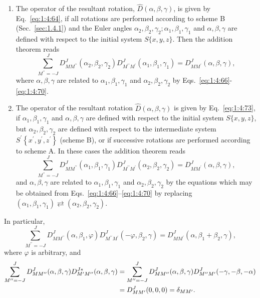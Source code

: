 \begin{enumerate}[label=(\alph*)]
\item The operator of the resultant rotation, $\widehat{D}(\alpha, \beta, \gamma)$, is given by Eq.~\eqref{eq:1:4:64}, if all rotations are performed according to scheme B (Sec.~\ref{sec:1.4.1}) and the Euler angles $\alpha_{2}, \beta_{2}, \gamma_{2} ; \alpha_{1}, \beta_{1}, \gamma_{1}$ and $\alpha, \beta, \gamma$ are defined with respect to the initial system $S\{x, y, z\}$. Then the addition theorem reads
\begin{equation}
\sum_{M^{\prime \prime}=-J}^{J} D_{M M^{\prime \prime}}^{J}\left(\alpha_{2}, \beta_{2}, \gamma_{2}\right) D_{M^{\prime \prime} M^{\prime}}^{J}\left(\alpha_{1}, \beta_{1}, \gamma_{1}\right)=D_{M M^{\prime}}^{J}(\alpha, \beta, \gamma) ,\label{eq:4:7:1}
\end{equation}
where $\alpha, \beta, \gamma$ are related to $\alpha_{1}, \beta_{1}, \gamma_{1}$ and $\alpha_{2}, \beta_{2}, \gamma_{2}$ by Eqs.~\eqref{eq:1:4:66}-\eqref{eq:1:4:70}.\\
\item The operator of the resultant rotation $\hat{D}(\alpha, \beta, \gamma)$ is given by Eq.~\eqref{eq:1:4:73}, if $\alpha_{1}, \beta_{1}, \gamma_{1}$ and $\alpha, \beta, \gamma$ are defined with respect to the initial system $S\{x, y, z\}$, but $\alpha_{2}, \beta_{2}, \gamma_{2}$ are defined with respect to the intermediate system $S^{\prime}\left\{x^{\prime}, y^{\prime}, z^{\prime}\right\}$ (scheme B), or if successive rotations are performed according to scheme A. In these cases the addition theorem reads
\begin{equation}
\sum_{M^{\prime \prime}=-J}^{J} D_{M M^{\prime \prime}}^{J}\left(\alpha_{1}, \beta_{1}, \gamma_{1}\right) D_{M^{\prime \prime} M^{\prime}}^{J}\left(\alpha_{2}, \beta_{2}, \gamma_{2}\right)=D_{M M^{\prime}}^{J}(\alpha, \beta, \gamma) ,\label{eq:4:7:2}
\end{equation}
and $\alpha, \beta, \gamma$ are related to $\alpha_{1}, \beta_{1}, \gamma_{1}$ and $\alpha_{2}, \beta_{2}, \gamma_{2}$ by the equations which may be obtained from Eqs.~\eqref{eq:1:4:66}--\eqref{eq:1:4:70} by replacing $\left(\alpha_{1}, \beta_{1}, \gamma_{1}\right) \rightleftarrows\left(\alpha_{2}, \beta_{2}, \gamma_{2}\right)$.
\end{enumerate}
In particular,
\begin{equation}
\sum_{M^{\prime \prime}=-J}^{J} D_{M M^{\prime \prime}}^{J}\left(\alpha, \beta_{1}, \varphi\right) D_{M^{\prime \prime} M^{\prime}}^{J}\left(-\varphi, \beta_{2}, \gamma\right)=D_{M M^{\prime}}^{J}\left(\alpha, \beta_{1}+\beta_{2}, \gamma\right), \label{eq:4:7:3}
\end{equation}
where $\varphi$ is arbitrary, and
\begin{align}
\sum_{M^{\prime \prime}=-J}^{J} D_{M M^{\prime \prime}}^{J}(\alpha, \beta, \gamma) D_{M^{\prime} M^{\prime \prime}}^{J *}(\alpha, \beta, \gamma) & =\sum_{M^{\prime \prime}=-J}^{J} D_{M M^{\prime \prime}}^{J}(\alpha, \beta, \gamma) D_{M^{\prime \prime} M^{\prime}}^{J}(-\gamma,-\beta,-\alpha)  \notag\\
& =D_{M M^{\prime}}^{J}(0,0,0)=\delta_{M M^{\prime}}. \label{eq:4:7:4}
\end{align}
